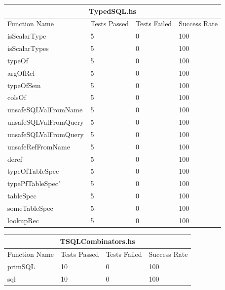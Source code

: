 \documentclass[12pt, svgnames]{article}
\begin{document}
\begin{adjustwidth}{-0.5cm}{}    
    \begin{tabular}[h!]{ |p{5cm}||p{3cm}|p{3cm}|p{3cm}|  }
        
        \hline
        \multicolumn{4}{|c|}{TypedSQL.hs} \\
        \hline
        Function Name & Tests Passed & Tests Failed & Success Rate\\
        \hline
        isScalarType   & 5    &0&   100\\
        isScalarTypes&   5  & 0   &100\\
        typeOf &5 & 0&  100\\
        argOfRel &5 & 0&  100\\
        typeOfSem&   5  & 0&100\\
        colsOf& 5  & 0   &100\\
        unsafeSQLValFromName& 5  & 0&100\\
        unsafeSQLValFromQuery& 5  & 0&100\\
        unsafeSQLValFromQuery& 5  & 0&100\\
        unsafeRefFromName& 5  & 0& 100\\
        deref& 5  & 0&100\\
        typeOfTableSpec& 5  & 0&100\\
        typePfTableSpec'& 5  & 0&100\\
        tableSpec& 5  & 0&100\\
        someTableSpec& 5  & 0&100\\
        lookupRec& 5  & 0&100\\
        \hline
    \end{tabular}
\end{adjustwidth}

\begin{adjustwidth}{-0.5cm}{}    
    \begin{tabular}[h!]{ |p{5cm}||p{3cm}|p{3cm}|p{3cm}|  }
        
        \hline
        \multicolumn{4}{|c|}{TSQLCombinators.hs} \\
        \hline
        Function Name & Tests Passed & Tests Failed & Success Rate\\
        \hline
        primSQL   & 10  & 0&   100\\
        sql       & 10  & 0&   100\\
        \hline
    \end{tabular}
\end{adjustwidth}
\end{document}
